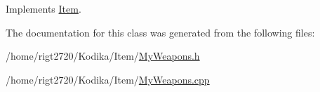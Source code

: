 Implements \hyperlink{classItem_a790283e2fb63df00eb61a95bb9921051}{Item}.



The documentation for this class was generated from the following files\-:\begin{DoxyCompactItemize}
\item 
/home/rigt2720/\-Kodika/\-Item/\hyperlink{MyWeapons_8h}{My\-Weapons.\-h}\item 
/home/rigt2720/\-Kodika/\-Item/\hyperlink{MyWeapons_8cpp}{My\-Weapons.\-cpp}\end{DoxyCompactItemize}
